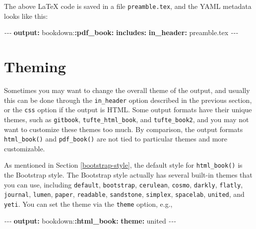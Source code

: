 \documentclass[
  12pt,
]{krantz}
\newenvironment{Shaded}{\begin{snugshade}}{\end{snugshade}}
\newcommand{\AttributeTok}[1]{\textcolor[rgb]{0.13,0.29,0.53}{#1}}
\newcommand{\FunctionTok}[1]{\textcolor[rgb]{0.13,0.29,0.53}{\textbf{#1}}}
\newcommand{\KeywordTok}[1]{\textcolor[rgb]{0.13,0.29,0.53}{\textbf{#1}}}
\newcommand{\PreprocessorTok}[1]{\textcolor[rgb]{0.56,0.35,0.01}{\textit{#1}}}
\theoremstyle{definition}
\theoremstyle{definition}
\theoremstyle{definition}
\theoremstyle{definition}
\theoremstyle{remark}
\begin{document}
The above LaTeX code is saved in a file \texttt{preamble.tex}, and the YAML metadata looks like this:

\begin{Shaded}
\begin{Highlighting}[]
\PreprocessorTok{{-}{-}{-}}
\FunctionTok{output}\KeywordTok{:}
\AttributeTok{  bookdown:}\FunctionTok{:pdf\_book}\KeywordTok{:}
\AttributeTok{    }\FunctionTok{includes}\KeywordTok{:}
\AttributeTok{      }\FunctionTok{in\_header}\KeywordTok{:}\AttributeTok{ preamble.tex}
\PreprocessorTok{{-}{-}{-}}
\end{Highlighting}
\end{Shaded}

\section{Theming}\label{theming}

Sometimes you may want to change the overall theme of the output, and usually this can be done through the \texttt{in\_header} option described in the previous section, or the \texttt{css} option if the output is HTML. Some output formats have their unique themes, such as \texttt{gitbook}, \texttt{tufte\_html\_book}, and \texttt{tufte\_book2}, and you may not want to customize these themes too much. By comparison, the output formats \texttt{html\_book()} and \texttt{pdf\_book()} are not tied to particular themes and more customizable.

As mentioned in Section \ref{bootstrap-style}, the default style for \texttt{html\_book()} is the Bootstrap style. The Bootstrap style actually has several built-in themes that you can use, including \texttt{default}, \texttt{bootstrap}, \texttt{cerulean}, \texttt{cosmo}, \texttt{darkly}, \texttt{flatly}, \texttt{journal}, \texttt{lumen}, \texttt{paper}, \texttt{readable}, \texttt{sandstone}, \texttt{simplex}, \texttt{spacelab}, \texttt{united}, and \texttt{yeti}. You can set the theme via the \texttt{theme} option, e.g.,

\begin{Shaded}
\begin{Highlighting}[]
\PreprocessorTok{{-}{-}{-}}
\FunctionTok{output}\KeywordTok{:}
\AttributeTok{  bookdown:}\FunctionTok{:html\_book}\KeywordTok{:}
\AttributeTok{    }\FunctionTok{theme}\KeywordTok{:}\AttributeTok{ united}
\PreprocessorTok{{-}{-}{-}}
\end{Highlighting}
\end{Shaded}
\end{document}
